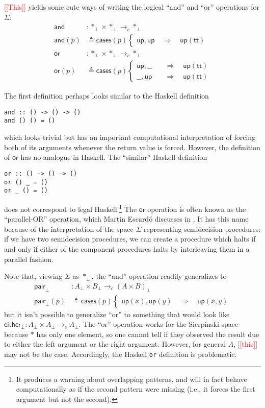\documentclass[conference]{IEEEtran}
\newcommand{\cto}{\to_c}
\newcommand{\One}{\ast}
\newcommand{\Branch}{\Rightarrow}
\newcommand{\note}[1]{\textcolor{red}{[[{#1}]]}}
\newcommand{\up}{\mathsf{up}}
\begin{document}
\note{This} yields some cute ways of writing the logical ``and'' and ``or'' operations for $\Sigma$:
\begin{align*}
\mathsf{and} &: \One_\bot \times \One_\bot \cto \One_\bot
\\ \mathsf{and}(p) &\triangleq \mathsf{cases}(p)
\begin{cases}
\up , \up
  \quad \Branch \quad \up(\mathsf{tt})
\end{cases}
\\
\mathsf{or} &: \One_\bot \times \One_\bot \cto \One_\bot
\\ \mathsf{or}(p) &\triangleq \mathsf{cases}(p)
\begin{cases}
\up , \_\_
  \quad &\Branch \quad \up(\mathsf{tt})
\\  \_\_ , \up
  \quad &\Branch \quad \up(\mathsf{tt})
\end{cases}
\end{align*}

The first definition perhaps looks similar to the Haskell definition
\begin{verbatim}
and :: () -> () -> ()
and () () = ()
\end{verbatim}
which looks trivial but has an important computational interpretation of forcing both of its arguments whenever the return value is forced. However, the definition of $\mathsf{or}$ has no analogue in Haskell. The ``similar'' Haskell definition
\begin{verbatim}
or :: () -> () -> ()
or () _ = ()
or _ () = ()
\end{verbatim}
does not correspond to legal Haskell.\footnote{It produces a warning about overlapping patterns, and will in fact behave computationally as if the second pattern were missing (i.e., it forces the first argument but not the second).} The $\mathsf{or}$ operation is often known as the ``parallel-OR'' operation, which Mart\'in Escard\'o discusses in \cite{escardo2004}. It has this name because of the interpretation of the space $\Sigma$ representing semidecision procedures: if we have two semidecision procedures, we can create a procedure which halts if and only if either of the component procedures halts by interleaving them in a parallel fashion.

Note that, viewing $\Sigma$ as $\One_\bot$, the ``and'' operation readily generalizes to 
\begin{align*}
 \mathsf{pair}_\bot &: A_\bot \times B_\bot \cto \left( A \times B \right)_\bot
\\ \mathsf{pair}_\bot(p) &\triangleq \mathsf{cases}(p)
\begin{cases}
\up(x) , \up(y)
  \quad \Branch \quad \up(x, y)
\end{cases}
\end{align*}
but it isn't possible to generalize ``or'' to something that would look like $ \mathsf{either}_\bot: A_\bot \times A_\bot \cto A_\bot$. The ``or'' operation works for the Sierp\'inski space because $\One$ has only one element, so one cannot tell if they observed the result due to either the left argument or the right argument. However, for general $A$, \note{this} may not be the case. Accordingly, the Haskell \texttt{or} definition is problematic.
\end{document}
